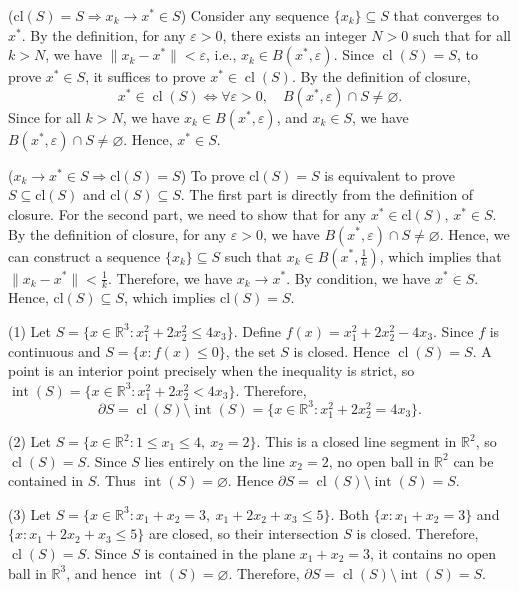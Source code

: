 \documentclass[12pt,a4paper]{article}
\begin{document}
\begin{problem}
    ($\text{cl}(S)=S \Rightarrow x_k \to x^* \in S$) Consider any sequence \(\{x_k\}\subseteq S\) that converges to \(x^*\). By the definition, for any $\varepsilon > 0$, there exists an integer \(N>0\) such that for all \(k>N\), we have \(\|x_k-x^*\|<\varepsilon\), i.e., $x_k \in B(x^*,\varepsilon)$. Since $\operatorname{cl}(S)=S$, to prove $x^*\in S$, it suffices to prove $x^*\in\operatorname{cl}(S)$. By the definition of closure,
    \[
    x^*\in\operatorname{cl}(S)\iff\forall\varepsilon>0,\quad B(x^*,\varepsilon)\cap S\neq\varnothing.
    \]
    Since for all $k>N$, we have $x_k \in B(x^*,\varepsilon)$, and $x_k \in S$, we have $B(x^*,\varepsilon)\cap S \neq \varnothing$. Hence, $x^* \in S$.

    ($x_k \to x^* \in S \Rightarrow \text{cl}(S)=S$) To prove $\text{cl}(S)=S$ is equivalent to prove $S \subseteq \text{cl}(S)$ and $\text{cl}(S) \subseteq S$. The first part is directly from the definition of closure. For the second part, we need to show that for any $x^* \in \text{cl}(S)$, $x^* \in S$. By the definition of closure, for any $\varepsilon > 0$, we have $B(x^*,\varepsilon)\cap S \neq \varnothing$. Hence, we can construct a sequence $\{x_k\}\subseteq S$ such that $x_k \in B(x^*,\frac{1}{k})$, which implies that $\|x_k-x^*\|<\frac{1}{k}$. Therefore, we have $x_k \to x^*$. By condition, we have $x^* \in S$. Hence, $\text{cl}(S) \subseteq S$, which implies $\text{cl}(S)=S$.
    
\end{problem}

\begin{problem}
     (1) Let \(S=\{x\in\mathbb{R}^3:x_1^2+2x_2^2\le 4x_3\}\). Define \(f(x)=x_1^2+2x_2^2-4x_3\). Since \(f\) is continuous and \(S=\{x:f(x)\le 0\}\), the set \(S\) is closed. Hence \(\operatorname{cl}(S)=S\). A point is an interior point precisely when the inequality is strict, so \(\operatorname{int}(S)=\{x\in\mathbb{R}^3:x_1^2+2x_2^2<4x_3\}\). Therefore,
     \[
     \partial S=\operatorname{cl}(S)\setminus\operatorname{int}(S)=\{x\in\mathbb{R}^3:x_1^2+2x_2^2=4x_3\}.
     \]

    (2) Let \(S=\{x\in\mathbb{R}^2:1\le x_1\le 4,\ x_2=2\}\). This is a closed line segment in \(\mathbb{R}^2\), so \(\operatorname{cl}(S)=S\). Since \(S\) lies entirely on the line \(x_2=2\), no open ball in \(\mathbb{R}^2\) can be contained in \(S\). Thus \(\operatorname{int}(S)=\varnothing\). Hence \(\partial S=\operatorname{cl}(S)\setminus\operatorname{int}(S)=S\).

    (3) Let \(S=\{x\in\mathbb{R}^3:x_1+x_2=3,\ x_1+2x_2+x_3\le 5\}\). Both \(\{x:x_1+x_2=3\}\) and \(\{x:x_1+2x_2+x_3\le 5\}\) are closed, so their intersection \(S\) is closed. Therefore, \(\operatorname{cl}(S)=S\). Since \(S\) is contained in the plane \(x_1+x_2=3\), it contains no open ball in \(\mathbb{R}^3\), and hence \(\operatorname{int}(S)=\varnothing\). Therefore, \(\partial S=\operatorname{cl}(S)\setminus\operatorname{int}(S)=S\).
\end{problem}
\end{document}
